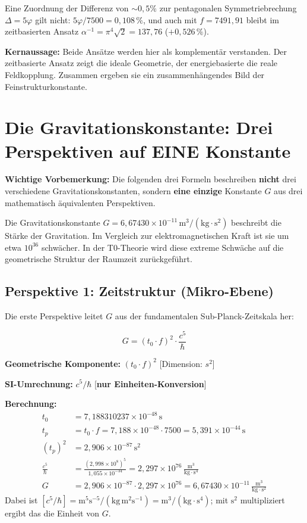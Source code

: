 	Eine Zuordnung der Differenz von \(\sim0{,}5\%\) zur pentagonalen Symmetriebrechung \(\Delta = 5\varphi\) gilt nicht: $5\varphi/7500 = 0{,}108\,\%$, und auch mit $f = 7491{,}91$ bleibt im zeitbasierten Ansatz $\alpha^{-1} = \pi^4\sqrt{2} = 137{,}76$ ($+0{,}526\,\%$).
	
	\textbf{Kernaussage:} Beide Ansätze werden hier als komplementär verstanden. Der zeitbasierte Ansatz zeigt die ideale Geometrie, der energiebasierte die reale Feldkopplung. Zusammen ergeben sie ein zusammenhängendes Bild der Feinstrukturkonstante.
	
	\section{Die Gravitationskonstante: Drei Perspektiven auf EINE Konstante}
	
	\textbf{Wichtige Vorbemerkung:} Die folgenden drei Formeln beschreiben \textbf{nicht} drei verschiedene Gravitationskonstanten, sondern \textbf{eine einzige} Konstante \(G\) aus drei mathematisch äquivalenten Perspektiven.
	
	Die Gravitationskonstante \(G = 6{,}67430 \times 10^{-11}\,\text{m}^3/(\text{kg} \cdot \text{s}^2)\) beschreibt die Stärke der Gravitation. Im Vergleich zur elektromagnetischen Kraft ist sie um etwa \(10^{36}\) schwächer. In der T0-Theorie wird diese extreme Schwäche auf die geometrische Struktur der Raumzeit zurückgeführt.
	
	\subsection{Perspektive 1: Zeitstruktur (Mikro-Ebene)}
	
	Die erste Perspektive leitet \(G\) aus der fundamentalen Sub-Planck-Zeitskala her:
	
	\begin{equation}
		\boxed{G = (t_0 \cdot f)^2 \cdot \frac{c^5}{\hbar}}
	\end{equation}
	
	\textbf{Geometrische Komponente:} \((t_0 \cdot f)^2\) [Dimension: \(s^2\)]
	
	\textbf{SI-Umrechnung:} \(c^5/\hbar\) [\textbf{nur Einheiten-Konversion}]
	
	\textbf{Berechnung:}
	\begin{align}
		t_0 &= 7{,}188310237 \times 10^{-48}\,\text{s} \\
		t_p &= t_0 \cdot f = 7{,}188 \times 10^{-48} \cdot 7500 = 5{,}391 \times 10^{-44}\,\text{s} \\
		(t_p)^2 &= 2{,}906 \times 10^{-87}\,\text{s}^2 \\
		\frac{c^5}{\hbar} &= \frac{(2{,}998 \times 10^8)^5}{1{,}055 \times 10^{-34}} = 2{,}297 \times 10^{76}\,\frac{\text{m}^3}{\text{kg} \cdot \text{s}^4} \\
		G &= 2{,}906 \times 10^{-87} \cdot 2{,}297 \times 10^{76} = 6{,}67430 \times 10^{-11}\,\frac{\text{m}^3}{\text{kg} \cdot \text{s}^2}
	\end{align}
	Dabei ist $[c^5/\hbar] = \text{m}^5\text{s}^{-5}/(\text{kg}\,\text{m}^2\text{s}^{-1}) = \text{m}^3/(\text{kg}\cdot\text{s}^4)$; mit $\text{s}^2$ multipliziert ergibt das die Einheit von $G$.
	
